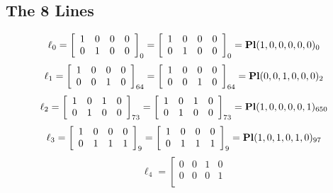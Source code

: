 \documentclass{article}
\begin{document}
{\subsection*{The 8 Lines}
$$
\ell_{0} = 
\left[
\begin{array}{*{4}{r}}
1 & 0 & 0 & 0\\
0 & 1 & 0 & 0\\
\end{array}
\right]
_{0}
=
\left[
\begin{array}{*{4}c}
1  & 0  & 0  & 0\\
0  & 1  & 0  & 0\\
\end{array}
\right]_{0}
={\rm\bf Pl}(1,0,0,0,0,0 )_{0}$$
$$
\ell_{1} = 
\left[
\begin{array}{*{4}{r}}
1 & 0 & 0 & 0\\
0 & 0 & 1 & 0\\
\end{array}
\right]
_{64}
=
\left[
\begin{array}{*{4}c}
1  & 0  & 0  & 0\\
0  & 0  & 1  & 0\\
\end{array}
\right]_{64}
={\rm\bf Pl}(0,0,1,0,0,0 )_{2}$$
$$
\ell_{2} = 
\left[
\begin{array}{*{4}{r}}
1 & 0 & 1 & 0\\
0 & 1 & 0 & 0\\
\end{array}
\right]
_{73}
=
\left[
\begin{array}{*{4}c}
1  & 0  & 1  & 0\\
0  & 1  & 0  & 0\\
\end{array}
\right]_{73}
={\rm\bf Pl}(1,0,0,0,0,1 )_{650}$$
$$
\ell_{3} = 
\left[
\begin{array}{*{4}{r}}
1 & 0 & 0 & 0\\
0 & 1 & 1 & 1\\
\end{array}
\right]
_{9}
=
\left[
\begin{array}{*{4}c}
1  & 0  & 0  & 0\\
0  & 1  & 1  & 1\\
\end{array}
\right]_{9}
={\rm\bf Pl}(1,0,1,0,1,0 )_{97}$$
$$
\ell_{4} = 
\left[
\begin{array}{*{4}{r}}
0 & 0 & 1 & 0\\
0 & 0 & 0 & 1\\
\end{array}
$$}
\end{document}
